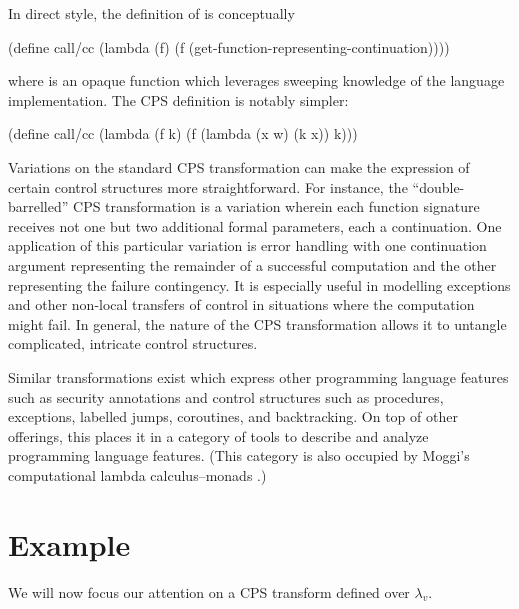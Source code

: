 \documentclass[ms,electronic,twosidetoc,letterpaper,chaptercenter,parttop]{byumsphd}
\newcommand{\lv}{$\lambda_v$}
\begin{document}
In direct style, the definition of  is conceptually 
\begin{schemedisplay}
(define call/cc
  (lambda (f)
    (f (get-function-representing-continuation))))
\end{schemedisplay}
where  is an opaque function which leverages
sweeping knowledge of the language implementation. The CPS definition is notably simpler:
\begin{schemedisplay}
(define call/cc
  (lambda (f k)
    (f (lambda (x w) (k x)) k)))
\end{schemedisplay}

Variations on the standard CPS transformation can make the expression of certain control
structures more straightforward. For instance, the ``double-barrelled'' CPS transformation
is a variation wherein each function signature receives not one but two additional formal
parameters, each a continuation. One application of this particular variation is error
handling with one continuation argument representing the remainder of a successful
computation and the other representing the failure contingency. It is especially useful in
modelling exceptions and other non-local transfers of control in situations where the
computation might fail. In general, the nature of the CPS transformation allows it to
untangle complicated, intricate control structures.

Similar transformations exist which express other programming language features such as
security annotations \cite{wallach2000safkasi} and control structures such as procedures,
exceptions, labelled jumps, coroutines, and backtracking. On top of other offerings, this
places it in a category of tools to describe and analyze programming language features.
(This category is also occupied by Moggi's computational lambda calculus--monads
\cite{moggi1989computational}.)

\section{Example}

We will now focus our attention on a CPS transform defined over \lv.
\end{document}

